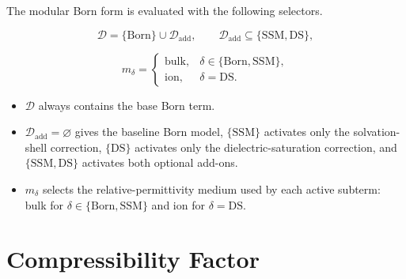 \documentclass[12pt, letterpaper]{article}
\begin{document}
The modular Born form is evaluated with the following selectors.


\begin{equation}
\mathcal{D}
=
\{\mathrm{Born}\}
\cup
\mathcal{D}_{\mathrm{add}},
\qquad
\mathcal{D}_{\mathrm{add}}
\subseteq
\{\mathrm{SSM},\mathrm{DS}\},
\label{eq:born_mode_set}
\end{equation}


\begin{equation}
    m_\delta
    =
    \begin{cases}
        \mathrm{bulk}, & \delta\in\{\mathrm{Born},\mathrm{SSM}\}, \\
        \mathrm{ion},  & \delta=\mathrm{DS}.
    \end{cases}
    \label{eq:born_mode_medium}
\end{equation}

\begin{itemize}
    \item \(\mathcal{D}\) always contains the base Born term.
    \item \(\mathcal{D}_{\mathrm{add}}=\varnothing\) gives the baseline Born model, \(\{\mathrm{SSM}\}\) activates only the solvation-shell correction, \(\{\mathrm{DS}\}\) activates only the dielectric-saturation correction, and \(\{\mathrm{SSM},\mathrm{DS}\}\) activates both optional add-ons.
    \item \(m_\delta\) selects the relative-permittivity medium used by each active subterm: bulk for \(\delta\in\{\mathrm{Born},\mathrm{SSM}\}\) and ion for \(\delta=\mathrm{DS}\).
\end{itemize}




\section{Compressibility Factor}
\label{sec:pressure_compressibility_factor}
\end{document}
